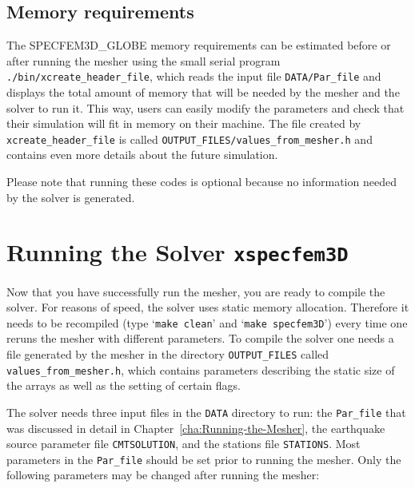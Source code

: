 \documentclass[oneside,english]{book}
\begin{document}
\section{Memory requirements}

The SPECFEM3D\_GLOBE memory requirements can be estimated before or
after running the mesher using the small serial program \texttt{\small ./bin/xcreate\_header\_file},
which reads the input file \texttt{\small DATA/Par\_file} and displays
the total amount of memory that will be needed by the mesher and the
solver to run it. This way, users can easily modify the parameters
and check that their simulation will fit in memory on their machine.
The file created by \texttt{\small xcreate\_header\_file} is called
\texttt{OUTPUT\_FILES/values\_from\_mesher.h} and contains even more
details about the future simulation.



Please note that running these codes is optional because no information
needed by the solver is generated.

\chapter{\label{cha:Running-the-Solver}Running the Solver \texttt{xspecfem3D}}

Now that you have successfully run the mesher, you are ready to compile
the solver. For reasons of speed, the solver uses static memory allocation.
Therefore it needs to be recompiled (type `\texttt{make clean}' and
`\texttt{make specfem3D}') every time one reruns the mesher with different
parameters. To compile the solver one needs a file generated by the
mesher in the directory \texttt{OUTPUT\_FILES} called \texttt{values\_from\_mesher.h},
which contains parameters describing the static size of the arrays
as well as the setting of certain flags.

The solver needs three input files in the \texttt{DATA} directory
to run: the \texttt{Par\_file} that was discussed in detail in Chapter~\ref{cha:Running-the-Mesher},
the earthquake source parameter file \texttt{CMTSOLUTION}, and the
stations file \texttt{STATIONS}. Most parameters in the \texttt{Par\_file}
should be set prior to running the mesher. Only the following parameters
may be changed after running the mesher:
\end{document}
